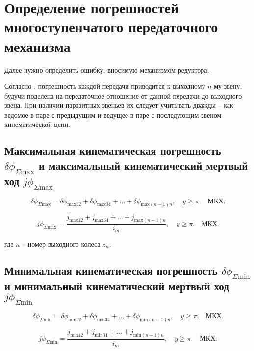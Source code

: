 \newpage
\section{Определение погрешностей многоступенчатого передаточного механизма}
Далее нужно определить ошибку, вносимую механизмом редуктора.

Согласно \cite{Kin}, погрешность каждой передачи приводится к выходному $n$-му звену, будучи поделена на передаточное отношение от данной передачи до выходного звена. 
При наличии паразитных звеньев их следует учитывать дважды -- как ведомое в паре с предыдущим и ведущее в паре с последующим звеном кинематической цепи.

\subsection{Максимальная кинематическая погрешность $\delta\phi_{\Sigma \text{max}}$ и максимальный кинематический мертвый ход $j\phi_{\Sigma \text{max}}$}

\begin{equation}
    \delta\phi_{\Sigma \text{max}} = \delta\phi_{\text{max}12} + \delta\phi_{\text{max}34} + \dots + \delta\phi_{\text{max}(n-1)n}, \quad y \geq \pi. \quad \text{МКХ.} \tag{6.53}
\end{equation}

\begin{equation}
    j\phi_{\Sigma \text{max}} = \frac{j_{\text{max}12} + j_{\text{max}34} + \dots + j_{\text{max}(n-1)n}}{i_m}, \quad y \geq \pi. \quad \text{МКХ.} \tag{6.54}
\end{equation}

где $n$ -- номер выходного колеса $z_n$.

\subsection{Минимальная кинематическая погрешность $\delta\phi_{\Sigma \text{min}}$ и минимальный кинематический мертвый ход $j\phi_{\Sigma \text{min}}$}

\begin{equation}
    \delta\phi_{\Sigma \text{min}} = \delta\phi_{\text{min}12} + \delta\phi_{\text{min}34} + \dots + \delta\phi_{\text{min}(n-1)n}, \quad y \geq \pi. \quad \text{МКХ.} \tag{6.55}
\end{equation}

\begin{equation}
    j\phi_{\Sigma \text{min}} = \frac{j_{\text{min}12} + j_{\text{min}34} + \dots + j_{\text{min}(n-1)n}}{i_m}, \quad y \geq \pi. \quad \text{МКХ.} \tag{6.56}
\end{equation}




